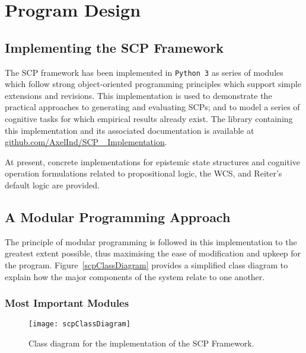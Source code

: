 \chapter{Program Design} \label{chp:program}
\section{Implementing the SCP Framework}

The SCP framework has been implemented in \texttt{Python 3} as series of modules which follow strong object-oriented programming principles which support simple extensions and revisions. This implementation is used to demonstrate the practical approaches to generating and evaluating SCPs; and to model a series of cognitive tasks for which empirical results already exist. The library containing this implementation and its associated documentation is available at \href{https://github.com/AxelInd/SCP_Implementation}{github.com/AxelInd/SCP\_ Implementation}.

At present, concrete implementations for epistemic state structures and cognitive operation formulations related to propositional logic, the WCS, and Reiter's default logic are provided.

\section{A Modular Programming Approach}
The principle of modular programming is followed in this implementation to the greatest extent possible, thus maximising the ease of modification and upkeep for the program. Figure~\ref{scpClassDiagram} provides a simplified class diagram to explain how the major components of the system relate to one another.

\subsection{Most Important Modules}

\begin{figure}
\centering \texttt{[image: scpClassDiagram]}
\caption{Class diagram for the implementation of the SCP Framework.}
\label{fig:scpClassDiagram}
\end{figure}

